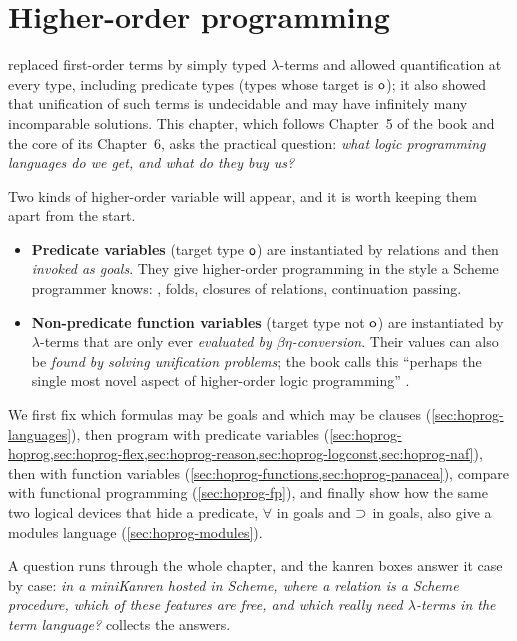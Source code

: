 \chapter{Higher-order programming}\label{ch:hoprog}

\newcommand{\hoprogE}[4]{#1;#2\mathrel{-\!\langle #3\rangle\!\!\longrightarrow}#4}
\newcommand{\hoprogT}[1]{\lBrack #1\rBrack}

 replaced first-order terms by simply typed $\lambda$-terms and allowed quantification at
every type, including predicate types (types whose target is $\mathsf{o}$); it also showed that unification of
such terms is undecidable and may have infinitely many incomparable solutions. This chapter, which follows
Chapter~5 of the book \cite{MillerNadathur2012} and the core of its Chapter~6, asks the practical
question: \emph{what logic programming languages do we get, and what do they buy us?}

Two kinds of higher-order variable will appear, and it is worth keeping them apart from the start.
\begin{itemize}
\item \textbf{Predicate variables} (target type $\mathsf{o}$) are instantiated by relations and then
  \emph{invoked as goals}. They give higher-order programming in the style a Scheme programmer knows:
  , folds, closures of relations, continuation passing.
\item \textbf{Non-predicate function variables} (target type not $\mathsf{o}$) are instantiated by
  $\lambda$-terms that are only ever \emph{evaluated by $\beta\eta$-conversion}. Their values can also be
  \emph{found by solving unification problems}; the book calls this ``perhaps the single most novel aspect
  of higher-order logic programming'' .
\end{itemize}
We first fix which formulas may be goals and which may be clauses (\cref{sec:hoprog-languages}), then
program with predicate variables (\cref{sec:hoprog-hoprog,sec:hoprog-flex,sec:hoprog-reason,sec:hoprog-logconst,sec:hoprog-naf}),
then with function variables (\cref{sec:hoprog-functions,sec:hoprog-panacea}), compare with functional
programming (\cref{sec:hoprog-fp}), and finally show how the same two logical devices that hide a
predicate, $\forall$ in goals and $\supset$ in goals, also give a modules language
(\cref{sec:hoprog-modules}).

A question runs through the whole chapter, and the kanren boxes answer it case by case: \emph{in a
miniKanren hosted in Scheme, where a relation is a Scheme procedure, which of these features are
free, and which really need $\lambda$-terms in the term language?}  collects the
answers.

